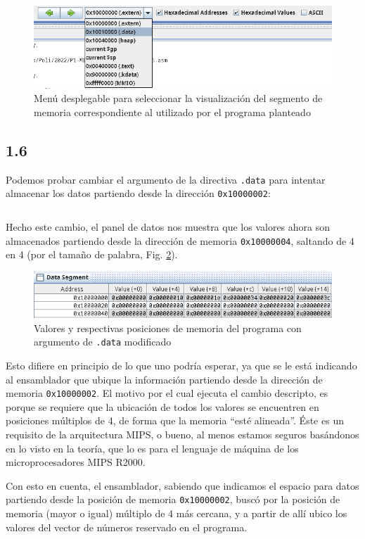 \documentclass[a4paper]{report}
\begin{document}
\begin{figure}[h]
    \centering
    \captionsetup{justification = centering}
    \includegraphics[width=.7\linewidth]{img/c1-5b}
    \caption{Menú desplegable para seleccionar la visualización del segmento de memoria correspondiente al utilizado por el programa planteado}
    \label{fig:dropdown-data}
\end{figure}

\subsection*{1.6}

Podemos probar cambiar el argumento de la directiva \texttt{.data} para intentar almacenar los datos partiendo desde la dirección \texttt{0x10000002}:

\vspace{7pt}
\inputminted[linenos]{gas}{src/cuestiones/c1-6.asm}
\vspace{7pt}

Hecho este cambio, el panel de datos nos muestra que los valores ahora son almacenados partiendo desde la dirección de memoria \texttt{0x10000004}, saltando de 4 en 4 (por el tamaño de palabra, Fig. \ref{fig:not-multiple}).

\begin{figure}[ht!]
    \centering
    \captionsetup{justification = centering}
    \includegraphics[width=.7\linewidth]{img/c1-6}
    \caption{Valores y respectivas posiciones de memoria del programa con argumento de \texttt{.data} modificado}
    \label{fig:not-multiple}
\end{figure}

Esto difiere en principio de lo que uno podría esperar, ya que se le está indicando al ensamblador que ubique la información partiendo desde la dirección de memoria \texttt{0x10000002}. El motivo por el cual ejecuta el cambio descripto, es porque se requiere que la ubicación de todos los valores se encuentren en posiciones múltiplos de 4, de forma que la memoria ``esté alineada''. Éste es un requisito de la arquitectura MIPS, o bueno, al menos estamos seguros basándonos en lo visto en la teoría, que lo es para el lenguaje de máquina de los microprocesadores MIPS R2000.

Con esto en cuenta, el ensamblador, sabiendo que indicamos el espacio para datos partiendo desde la posición de memoria \texttt{0x10000002}, buscó por la posición de memoria (mayor o igual) múltiplo de 4 más cercana, y a partir de allí ubico los valores del vector de números reservado en el programa.
\end{document}
